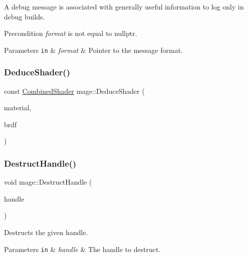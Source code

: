 A debug message is associated with generally useful information to log only in debug builds.

\begin{DoxyPrecond}{Precondition}
{\itshape format} is not equal to {\ttfamily nullptr}. 
\end{DoxyPrecond}

\begin{DoxyParams}[1]{Parameters}
\mbox{\tt in}  & {\em format} & Pointer to the message format. \\
\hline
\end{DoxyParams}
\hypertarget{namespacemage_a97abe2fe35044cd4e7dcda39c194075f}{}\label{namespacemage_a97abe2fe35044cd4e7dcda39c194075f} 
\subsubsection{\texorpdfstring{Deduce\+Shader()}{DeduceShader()}}
{\footnotesize\ttfamily const \hyperlink{structmage_1_1_combined_shader}{Combined\+Shader} mage\+::\+Deduce\+Shader (\begin{DoxyParamCaption}\item[{const \hyperlink{structmage_1_1_material}{Material} \&}]{material,  }\item[{\hyperlink{namespacemage_ae7a7a03a7b34d7e2689689bb8295cd38}{B\+R\+D\+F\+Type}}]{brdf }\end{DoxyParamCaption})}

\hypertarget{namespacemage_a7bf12816896ea8d126d397f0c6d571b1}{}\label{namespacemage_a7bf12816896ea8d126d397f0c6d571b1} 
\subsubsection{\texorpdfstring{Destruct\+Handle()}{DestructHandle()}}
{\footnotesize\ttfamily void mage\+::\+Destruct\+Handle (\begin{DoxyParamCaption}\item[{H\+A\+N\+D\+LE}]{handle }\end{DoxyParamCaption})}

Destructs the given handle.


\begin{DoxyParams}[1]{Parameters}
\mbox{\tt in}  & {\em handle} & The handle to destruct. \\
\hline
\end{DoxyParams}
\hypertarget{namespacemage_ae79d9f43e3d7f767b0ee86ce13be90b5}{}\label{namespacemage_ae79d9f43e3d7f767b0ee86ce13be90b5} 
